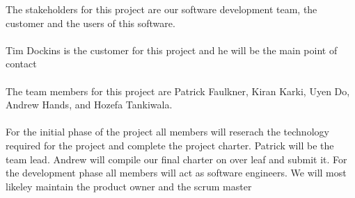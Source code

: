 
 The stakeholders for this project are our software development team, the customer and the users of this software.\\ 
 \\ Tim Dockins is the customer for this project and he will be the main point of contact\\
\\The team members for this project are Patrick Faulkner, Kiran Karki, Uyen Do, Andrew Hands, and Hozefa Tankiwala.\\ 
 \\For the initial phase of the project all members will reserach the technology required for the project and complete the project charter.
 Patrick will be the team lead. Andrew will compile our final charter on over leaf and submit it. 
 For the development phase all members will act as software engineers.
 We will most likeley maintain the product owner and the scrum master
 
 
 